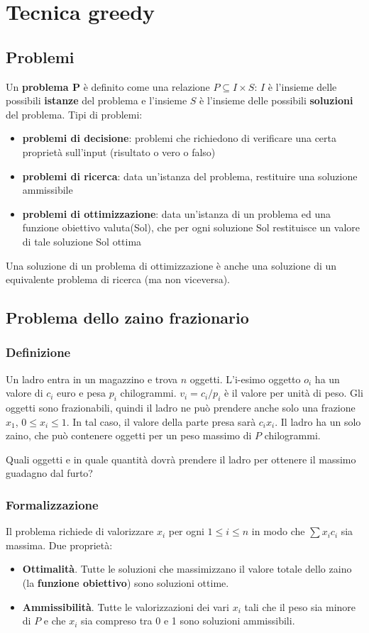 \documentclass[11pt]{article}
\begin{document}
\section{Tecnica greedy}
\subsection{Problemi}
Un \textbf{problema P} è definito come una relazione $P\subseteq I\times S$: $I$ è l'insieme delle possibili \textbf{istanze}
del problema e l'insieme $S$ è l'insieme delle possibili \textbf{soluzioni} del problema.
Tipi di problemi:
\begin{itemize}
    \item \textbf{problemi di decisione}: problemi che richiedono di verificare una certa proprietà sull'input (risultato 
    o vero o falso)
    \item \textbf{problemi di ricerca}: data un'istanza del problema, restituire una soluzione ammissibile
    \item \textbf{problemi di ottimizzazione}: data un'istanza di un problema ed una funzione obiettivo valuta(Sol), che per 
    ogni soluzione Sol restituisce un valore di tale soluzione Sol ottima
\end{itemize}
Una soluzione di un problema di ottimizzazione è anche una soluzione di un equivalente problema di ricerca (ma non viceversa).
\subsection{Problema dello zaino frazionario}
\subsubsection{Definizione}
Un ladro entra in un magazzino e trova $n$ oggetti. L'i-esimo oggetto $o_i$ ha un valore di $c_i$ euro e pesa $p_i$ chilogrammi.
$v_i=c_i/p_i$ è il valore per unità di peso. Gli oggetti sono frazionabili, quindi il ladro ne può prendere anche solo una 
frazione $x_1$, $0\leq x_i \leq 1$. In tal caso, il valore della parte presa sarà $c_ix_i$. Il ladro ha un solo zaino, che 
può contenere oggetti per un peso massimo di $P$ chilogrammi.

Quali oggetti e in quale quantità dovrà prendere il ladro per ottenere il massimo guadagno dal furto?
\subsubsection{Formalizzazione}
Il problema richiede di valorizzare $x_i$ per ogni $1\leq i \leq n$ in modo che $\sum x_ic_i$ sia massima. Due proprietà: 
\begin{itemize}
    \item \textbf{Ottimalità}. Tutte le soluzioni che massimizzano il valore totale dello zaino (la \textbf{funzione obiettivo}) 
    sono soluzioni ottime. 
    \item \textbf{Ammissibilità}. Tutte le valorizzazioni dei vari $x_i$ tali che il peso sia minore di $P$ e che $x_i$ 
    sia compreso tra 0 e 1 sono soluzioni ammissibili.
\end{itemize}
\end{document}
